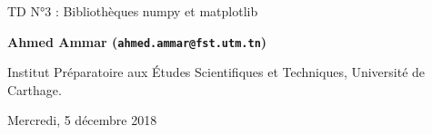 \documentclass[%
oneside,                 %
final,                   %
10pt,french]{article}
\begin{document}

\newcommand{\exercisesection}[1]{\subsection*{#1}}






\thispagestyle{empty}

\begin{center}
{\LARGE\bf
\begin{spacing}{1.25}
TD N°3 : Bibliothèques numpy et matplotlib
\end{spacing}
}
\end{center}


\begin{center}
{\bf Ahmed Ammar (\texttt{ahmed.ammar@fst.utm.tn})}
\end{center}

    \begin{center}
\centerline{{\small Institut Préparatoire aux Études Scientifiques et Techniques, Université de Carthage.}}
\end{center}
    

\begin{center}
Mercredi, 5 décembre 2018
\end{center}

\vspace{1cm}


\tableofcontents


\vspace{1cm} %




\end{document}

